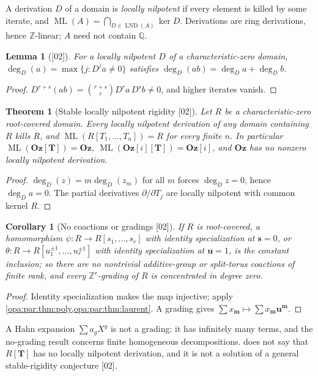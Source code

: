 \documentclass[11pt,oneside]{article}
\numberwithin{equation}{section}
\newtheorem{theorem}{Theorem}[section]
\newtheorem{lemma}[lemma]{Lemma}
\newtheorem{corollary}[corollary]{Corollary}
\theoremstyle{definition}
\theoremstyle{remark}
\newcommand{\Oz}{\mathbf{Oz}}
\newcommand{\Og}{\mathbf{Oz}[i]}
\newcommand{\Q}{\mathbb Q}
\newcommand{\Z}{\mathbb Z}
\newcommand{\ML}{\operatorname{ML}}
\newcommand{\LND}{\operatorname{LND}}
\newcommand{\src}[1]{\textup{\textsf{\small[#1]}}}
\begin{document}
A derivation $D$ of a domain is \emph{locally nilpotent} if every element is killed by
some iterate, and $\ML(A)=\bigcap_{D\in\LND(A)}\ker D$. Derivations are ring
derivations, hence $\Z$-linear; $A$ need not contain $\Q$.

\begin{lemma}[\src{02}]\label{opa:par:lem:lnddegree}
For a locally nilpotent $D$ of a characteristic-zero domain,
$\deg_D(a)=\max\{j:D^ja\ne0\}$ satisfies $\deg_D(ab)=\deg_Da+\deg_Db$.
\end{lemma}
\begin{proof}
$D^{r+s}(ab)=\binom{r+s}rD^ra\,D^sb\ne0$, and higher iterates vanish.
\end{proof}

\begin{theorem}[Stable locally nilpotent rigidity \src{02}]\label{opa:par:thm:ML}
Let $R$ be a characteristic-zero root-covered domain. Every locally nilpotent
derivation of any domain containing $R$ kills $R$, and
$\ML(R[T_1,\dots,T_n])=R$ for every finite $n$. In particular
$\ML(\Oz[\mathbf T])=\Oz$, $\ML(\Og[\mathbf T])=\Og$, and $\Oz$ has no nonzero locally
nilpotent derivation.
\end{theorem}
\begin{proof}
$\deg_D(z)=m\deg_D(z_m)$ for all $m$ forces $\deg_Dz=0$, hence $\deg_Da=0$. The partial
derivatives $\partial/\partial T_j$ are locally nilpotent with common kernel $R$.
\end{proof}

\begin{corollary}[No coactions or gradings \src{02}]\label{opa:par:cor:coaction}
If $R$ is root-covered, a homomorphism $\psi:R\to R[s_1,\dots,s_r]$ with identity
specialization at $\mathbf s=0$, or $\theta:R\to R[u_1^{\pm1},\dots,u_r^{\pm1}]$ with
identity specialization at $\mathbf u=1$, is the constant inclusion; so there are no
nontrivial additive-group or split-torus coactions of finite rank, and every
$\Z^r$-grading of $R$ is concentrated in degree zero.
\end{corollary}
\begin{proof}
Identity specialization makes the map injective; apply
\cref{opa:par:thm:poly,opa:par:thm:laurent}. A grading gives
$\sum x_{\mathbf m}\mapsto\sum x_{\mathbf m}\mathbf u^{\mathbf m}$.
\end{proof}

A Hahn expansion $\sum a_gX^g$ is not a grading: it has infinitely many terms, and the
no-grading result concerns finite homogeneous decompositions. 
does not say that $R[\mathbf T]$ has no locally nilpotent derivation, and it is not a
solution of a general stable-rigidity conjecture \cite{CD} \src{02}.
\end{document}
